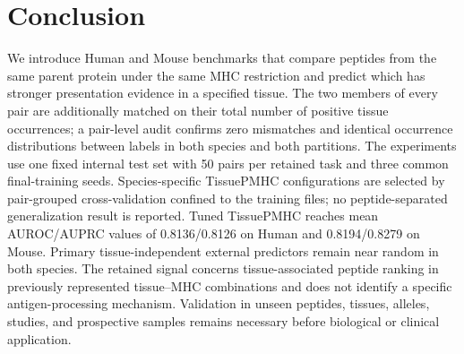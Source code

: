 \section{Conclusion}
We introduce Human and Mouse benchmarks that compare peptides from the same parent protein under the same MHC restriction and predict which has stronger presentation evidence in a specified tissue. The two members of every pair are additionally matched on their total number of positive tissue occurrences; a pair-level audit confirms zero mismatches and identical occurrence distributions between labels in both species and both partitions. The experiments use one fixed internal test set with 50 pairs per retained task and three common final-training seeds. Species-specific TissuePMHC configurations are selected by pair-grouped cross-validation confined to the training files; no peptide-separated generalization result is reported. Tuned TissuePMHC reaches mean AUROC/AUPRC values of 0.8136/0.8126 on Human and 0.8194/0.8279 on Mouse. Primary tissue-independent external predictors remain near random in both species. The retained signal concerns tissue-associated peptide ranking in previously represented tissue--MHC combinations and does not identify a specific antigen-processing mechanism. Validation in unseen peptides, tissues, alleles, studies, and prospective samples remains necessary before biological or clinical application.
